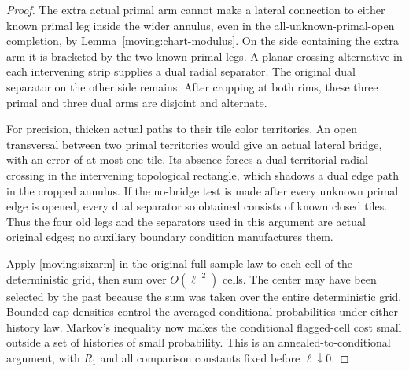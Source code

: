 \begin{proof}
The extra actual primal arm cannot make a lateral connection to
either known primal leg inside the wider annulus, even in the
all-unknown-primal-open completion, by
Lemma~\ref{moving:chart-modulus}.  On the side containing the extra
arm it is bracketed by the two known primal legs.  A planar crossing
alternative in each intervening strip supplies a dual radial
separator.  The original dual separator on the other side remains.
After cropping at both rims, these three primal and three dual arms
are disjoint and alternate.

For precision, thicken actual paths to their tile color territories.
An open transversal between two primal territories would give an
actual lateral bridge, with an error of at most one tile.  Its absence
forces a dual territorial radial crossing in the intervening
topological rectangle, which shadows a dual edge path in the cropped
annulus.  If the no-bridge test is made after every unknown primal
edge is opened, every dual separator so obtained consists of known
closed tiles.  Thus the four old legs and the separators used in
this argument are actual original edges; no auxiliary boundary
condition manufactures them.

Apply \eqref{moving:sixarm} in the original full-sample law to each
cell of the deterministic grid, then sum over $O(\ell^{-2})$ cells.
The center may have been selected by the past because the sum was
taken over the entire deterministic grid.  Bounded cap densities
control the averaged conditional probabilities under either history
law.  Markov's inequality now makes the conditional flagged-cell
cost small outside a set of histories of small probability.  This
is an annealed-to-conditional argument, with $R_1$ and all comparison
constants fixed before $\ell\downarrow0$.
\end{proof}

